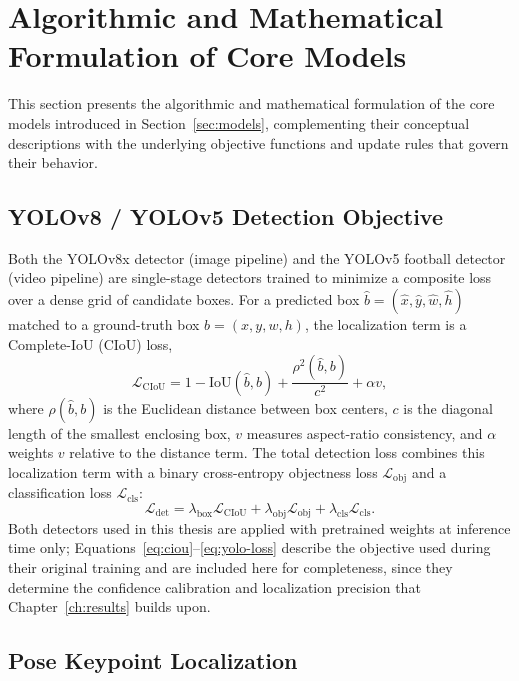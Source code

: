 \section{Algorithmic and Mathematical Formulation of Core Models}
\label{sec:algorithm-math}

This section presents the algorithmic and mathematical formulation of
the core models introduced in Section~\ref{sec:models}, complementing
their conceptual descriptions with the underlying objective functions
and update rules that govern their behavior.

\subsection{YOLOv8 / YOLOv5 Detection Objective}

Both the YOLOv8x detector (image pipeline) and the YOLOv5 football
detector (video pipeline) are single-stage detectors trained to
minimize a composite loss over a dense grid of candidate boxes. For a
predicted box $\hat{b} = (\hat{x}, \hat{y}, \hat{w}, \hat{h})$ matched
to a ground-truth box $b = (x, y, w, h)$, the localization term is a
Complete-IoU (CIoU) loss,
\begin{equation}
    \mathcal{L}_{\text{CIoU}} = 1 - \text{IoU}(\hat{b}, b)
    + \frac{\rho^2(\hat{b}, b)}{c^2} + \alpha v,
    \label{eq:ciou}
\end{equation}
where $\rho(\hat{b}, b)$ is the Euclidean distance between box centers,
$c$ is the diagonal length of the smallest enclosing box, $v$ measures
aspect-ratio consistency, and $\alpha$ weights $v$ relative to the
distance term. The total detection loss combines this localization
term with a binary cross-entropy objectness loss
$\mathcal{L}_{\text{obj}}$ and a classification loss
$\mathcal{L}_{\text{cls}}$:
\begin{equation}
    \mathcal{L}_{\text{det}} = \lambda_{\text{box}}\mathcal{L}_{\text{CIoU}}
    + \lambda_{\text{obj}}\mathcal{L}_{\text{obj}}
    + \lambda_{\text{cls}}\mathcal{L}_{\text{cls}}.
    \label{eq:yolo-loss}
\end{equation}
Both detectors used in this thesis are applied with pretrained weights
at inference time only; Equations~\ref{eq:ciou}--\ref{eq:yolo-loss}
describe the objective used during their original training and are
included here for completeness, since they determine the confidence
calibration and localization precision that Chapter~\ref{ch:results}
builds upon.

\subsection{Pose Keypoint Localization}

